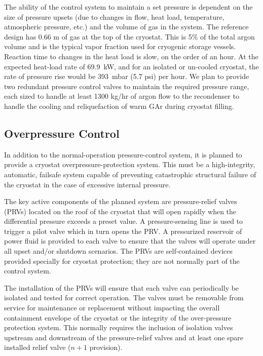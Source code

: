 The ability of the control system to maintain a set pressure is 
dependent on the size of pressure upsets (due to changes in flow, 
heat load, temperature, atmospheric pressure, etc.) and the volume 
of gas in the system.  The reference design has 0.66 m 
of gas at the top of the cryostat.  This is 5\% of the total 
argon volume and is the typical vapor fraction used for cryogenic 
storage vessels. Reaction time to changes in the heat load is slow, 
on the order of an hour.  At the expected heat-load rate of 
69.9~kW, and for an isolated or un-cooled cryostat,
the rate of pressure rise would be 393~mbar (5.7 psi) per hour. 
We plan to provide two redundant pressure control valves to 
maintain the required pressure range, each sized to handle 
at least 1300 kg/hr of argon flow to the recondenser to handle 
the cooling and reliquefaction of warm GAr during cryostat filling.


\subsection{Overpressure Control}

In addition to the normal-operation pressure-control system, 
it is planned to provide a cryostat overpressure-protection 
system. This must be a high-integrity, automatic, failsafe
system capable of preventing catastrophic structural failure
of the cryostat in the case of excessive internal pressure.

The key active components of the planned system are pressure-relief 
valves (PRVs) located on the roof of the cryostat that will open rapidly when the differential pressure exceeds a 
preset value. A pressure-sensing line is used to trigger a pilot 
valve which in turn opens the PRV. A pressurized reservoir of 
power fluid is provided to each valve to ensure that the valves 
will operate under all upset and/or shutdown scenarios. The PRVs 
are self-contained devices provided specially for cryostat protection; 
they are not normally part of the control system. 

The installation of the PRVs will ensure that each valve can 
periodically be isolated and tested for correct operation.  
The valves must be removable from service for maintenance 
or replacement without impacting the overall containment envelope 
of the cryostat or the integrity of the over-pressure protection 
system.  This normally requires the inclusion of isolation valves 
upstream and downstream of the pressure-relief valves and at least
one spare installed relief valve ($n+1$ provision).

